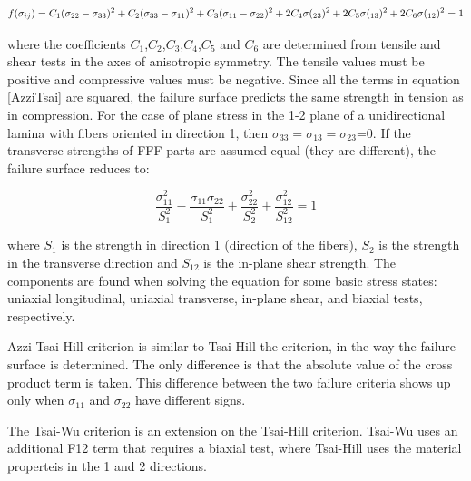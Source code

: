 
\begin{equation}\label{AzziTsai}
f(\sigma_{ij})=C_1(\sigma_{22}-\sigma_{33})^2+C_2(\sigma_{33}-\sigma_{11})^2+C_3(\sigma_{11}-\sigma_{22})^2
\\
+2C_4\sigma(_{23})^2+2C_5\sigma(_{13})^2+2C_6\sigma(_{12})^2=1 
\end{equation}

where the coefficients $C_1$,$C_2$,$C_3$,$C_4$,$C_5$ and $C_6$ are determined from tensile and shear tests in the axes of anisotropic symmetry. The tensile values must be positive and compressive values must be negative. Since all the terms in equation \ref{AzziTsai} are squared, the failure surface predicts the same strength in tension as in compression. For the case of plane stress in the 1-2 plane of a unidirectional lamina with fibers oriented in direction 1, then $\sigma_{33}=\sigma_{13}=\sigma_{23}$=0. If the transverse strengths of FFF parts are assumed equal (they are different), the failure surface reduces to:

\begin{equation}\label{planestress}
\frac{\sigma_{11}^2}{S_1^2}-\frac{\sigma_{11}\sigma_{22}}{S_1^2}+\frac{\sigma_{22}^2}{S_2^2}+\frac{\sigma_{12}^2}{S_{12}^2}=1
\end{equation}

where $S_1$ is the strength in direction 1 (direction of the fibers), $S_2$ is the strength in the transverse direction and $S_{12}$ is the in-plane shear strength. The components are found when solving the equation for some basic stress states: uniaxial longitudinal, uniaxial transverse, in-plane shear, and biaxial tests, respectively.

Azzi-Tsai-Hill criterion is similar to Tsai-Hill the  criterion, in the way the failure surface is determined. The only difference is that the absolute value of the cross product term is taken. This difference between the two failure criteria shows up only when $\sigma_{11}$ and $\sigma_{22}$ have different signs.

The Tsai-Wu criterion is an extension on the Tsai-Hill criterion. Tsai-Wu uses an additional F12 term that requires a biaxial test, where Tsai-Hill uses the material properteis in the 1 and 2 directions.  

